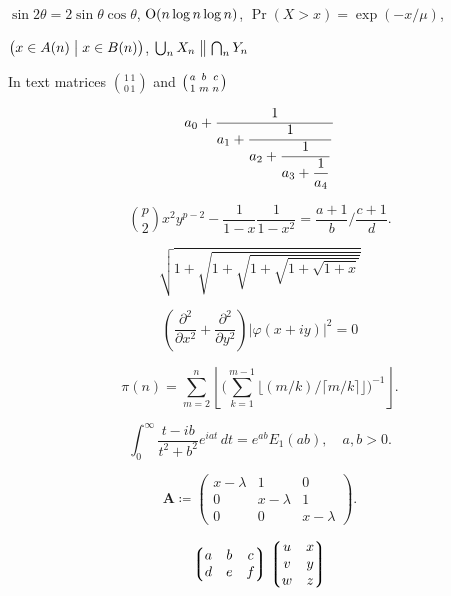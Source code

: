 \documentclass[11pt]{article}
\theoremstyle{oldplain}
\theoremstyle{plain}
\begin{document}
$\sin2\theta=2\sin\theta\cos\theta$, \quad
$\hbox{O}(n\log n\log n)$, \quad
$\Pr(X>x)=\exp(-x/\mu)$,

$\bigl(x\in A(n)\bigm|x\in B(n)\bigr)$, \quad
$\bigcup_n X_n\bigm\|\bigcap_n Y_n$


In text matrices $\binom{1\,1}{0\,1}$ and $\bigl(\genfrac{}{}{0pt}{}{a}{1}\genfrac{}{}{0pt}{}{b}{m}\genfrac{}{}{0pt}{}{c}{n}\bigr)$


$$a_0+\frac1{\displaystyle a_1 +
{\strut \frac1{\displaystyle a_2 +
{\strut \frac1{\displaystyle a_3 +
{\strut \frac1{\displaystyle a_4}}}}}}}$$


$$\binom{p}{2}x^2y^{p-2} - \frac1{1 - x}\frac{1}{1 - x^2}
=
\frac{a+1}{b}\bigg/\frac{c+1}{d}.$$


$$\sqrt{1+\sqrt{1+\sqrt{1+\sqrt{1+\sqrt{1+x}}}}}$$


$$\left(\frac{\partial^2}{\partial x^2} + \frac{\partial^2}{\partial y^2}\right)
\bigl|\varphi(x+iy)\bigr|^2=0$$



$$\pi(n)=\sum_{m=2}^n\left\lfloor\Biggl(\sum_{k=1}^{m-1}\bigl
\lfloor(m/k)\big/\lceil m/k\rceil\bigr\rfloor\Biggr)^{-1}\right\rfloor.$$


$$\int_0^\infty \frac{t - i b}{t^2 + b^2}e^{iat}\,dt=e^{ab}E_1(ab), \quad
a,b > 0.$$


$$\mathbf{A} \coloneq \begin{pmatrix}x-\lambda&1&0\\
0&x-\lambda&1\\
0&0&x-\lambda\end{pmatrix}.$$

$$\left\lgroup\begin{matrix}a&b&c\\ d&e&f\\\end{matrix}\right\rgroup
\left\lgroup\begin{matrix}u&x\cr v&y\cr w&z\end{matrix}\right\rgroup$$
\end{document}
